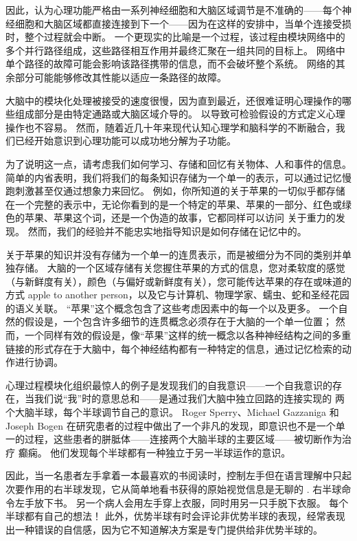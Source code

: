 因此，认为心理功能严格由一系列神经细胞和大脑区域调节是不准确的——每个神经细胞和大脑区域都直接连接到下一个——因为在这样的安排中，当单个连接受损时，整个过程就会中断。 一个更现实的比喻是一个过程，该过程由模块网络中的多个并行路径组成，这些路径相互作用并最终汇聚在一组共同的目标上。 网络中单个路径的故障可能会影响该路径携带的信息，而不会破坏整个系统。 网络的其余部分可能能够修改其性能以适应一条路径的故障。

大脑中的模块化处理被接受的速度很慢，因为直到最近，还很难证明心理操作的哪些组成部分是由特定通路或大脑区域介导的。 以导致可检验假设的方式定义心理操作也不容易。 然而，随着近几十年来现代认知心理学和脑科学的不断融合，我们已经开始意识到心理功能可以成功地分解为子功能。

为了说明这一点，请考虑我们如何学习、存储和回忆有关物体、人和事件的信息。 简单的内省表明，我们将我们的每条知识存储为一个单一的表示，可以通过记忆慢跑刺激甚至仅通过想象力来回忆。 例如，你所知道的关于苹果的一切似乎都存储在一个完整的表示中，无论你看到的是一个特定的苹果、苹果的一部分、红色或绿色的苹果、苹果这个词，还是一个伪造的故事，它都同样可以访问 关于重力的发现。 然而，我们的经验并不能忠实地指导知识是如何存储在记忆中的。

关于苹果的知识并没有存储为一个单一的连贯表示，而是被细分为不同的类别并单独存储。 大脑的一个区域存储有关您握住苹果的方式的信息，您对柔软度的感觉（与新鲜度有关），颜色（与偏好或新鲜度有关），您可能传达苹果的存在或味道的方式 apple to another person，以及它与计算机、物理学家、蠕虫、蛇和圣经花园的语义关联。 “苹果”这个概念包含了这些考虑因素中的每一个以及更多。 一个自然的假设是，一个包含许多细节的连贯概念必须存在于大脑的一个单一位置； 然而，一个同样有效的假设是，像“苹果”这样的统一概念以各种神经结构之间的多重链接的形式存在于大脑中，每个神经结构都有一种特定的信息，通过记忆检索的动作进行协调。

心理过程模块化组织最惊人的例子是发现我们的自我意识——一个自我意识的存在，当我们说“我”时的意思总和——是通过我们大脑中独立回路的连接实现的 两个大脑半球，每个半球调节自己的意识。 Roger Sperry、Michael Gazzaniga 和 Joseph Bogen 在研究患者的过程中做出了一个非凡的发现，即意识也不是一个单一的过程，这些患者的胼胝体——连接两个大脑半球的主要区域——被切断作为治疗 癫痫。 他们发现每个半球都有一种独立于另一半球运作的意识。

因此，当一名患者左手拿着一本最喜欢的书阅读时，控制左手但在语言理解中只起次要作用的右半球发现，它从简单地看书获得的原始视觉信息是无聊的 . 右半球命令左手放下书。 另一个病人会用左手穿上衣服，同时用另一只手脱下衣服。 每个半球都有自己的想法！ 此外，优势半球有时会评论非优势半球的表现，经常表现出一种错误的自信感，因为它不知道解决方案是专门提供给非优势半球的。

